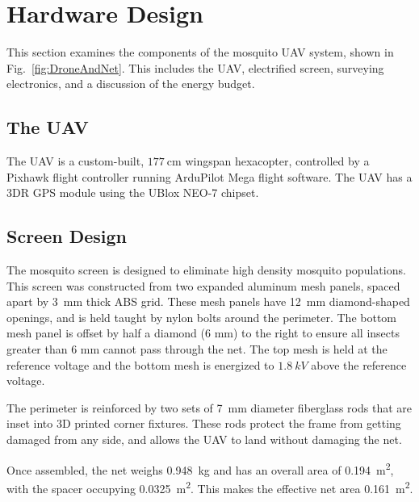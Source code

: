 \section[Hardware Design]{Hardware Design}

This section examines the components of the mosquito UAV system, shown in Fig.~\ref{fig:DroneAndNet}. This includes the UAV, electrified screen, surveying electronics, and a discussion of the energy budget. 

\subsection{The UAV}

The UAV is a custom-built, $\SI{177}{\centi\metre}$ wingspan hexacopter, controlled by a Pixhawk flight controller running ArduPilot Mega flight software. The UAV has a 3DR GPS module using the UBlox NEO-7 chipset.

\subsection{Screen Design}
The mosquito screen is designed to eliminate high density mosquito populations. 
This screen was constructed from two expanded aluminum mesh panels, spaced apart by \SI{3}{\milli\metre} thick ABS grid. 
These mesh panels have \SI{12}{\milli\metre} diamond-shaped  openings, and is held taught by nylon bolts around the perimeter.  
The bottom mesh panel is offset by half a diamond (6 mm) to the right to ensure all insects greater than 6 mm cannot pass through the net.
The top mesh is held at the reference voltage and the bottom mesh is energized to $1.8~kV$ above the reference voltage.

The perimeter is reinforced by two sets of \SI{7}{\milli\metre} diameter fiberglass rods that are inset into 3D printed corner fixtures.
These rods protect the frame from getting damaged from any side, and allows the UAV to land without damaging the net.


Once assembled, the net weighs \SI{0.948}{\kilogram} and has an overall area of \SI{0.194}{\square\metre}, with the spacer occupying \SI{0.0325}{\square\metre}. 
This makes the effective net area \SI{0.161}{\square\metre}. %



